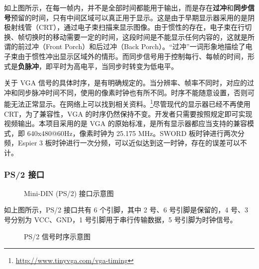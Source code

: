\documentclass[hyperref,UTF8,12pt,a4paper]{ctexart}
\begin{document}
如上图所示，在每一帧内，并不是全部时间都能用于输出，而是存在\textbf{过冲}和\textbf{同步信号}预留的时间，只有中间区域可以真正用于显示。这是由于早期显示器采用的是阴极射线管（CRT），通过电子束扫描来显示图像。由于惯性的存在，电子束在行切换、帧切换时的移动需要一定的时间，这段时间是不能显示任何内容的，这就是所谓的前过冲（Front
Porch）和后过冲（Back
Porch）。``过冲''一词形象地描绘了电子束由于惯性冲出显示区域外的情形。而同步信号用于控制每行、每帧的时间，形式是\textbf{负脉冲}，即平时为高电平，当同步时转变为低电平。

关于 VGA
信号的具体时序，是有明确规定的。当分辨率、帧率不同时，对应的过冲和同步脉冲时间不同，使用的像素时钟也有所不同。时序不能随意设置，否则可能无法正常显示。在网络上可以找到相关资料。\footnote{\url{http://www.tinyvga.com/vga-timing}}尽管现代的显示器已经不再使用
CRT，为了兼容性，VGA
的时序仍然保持不变。开发者只需要按照规定即可实现视频输出。本项目采用的是
VGA 的原始标准，是所有显示器都应当支持的兼容模式，即
640x480@60Hz，像素时钟为 25.175 MHz。SWORD 板时钟进行两次分频，Espier 3
板时钟进行一次分频，可以近似达到这一时钟，存在的误差可以不计。

\hypertarget{ps2-ux63a5ux53e3}{%
\subsubsection{PS/2 接口}\label{ps2-ux63a5ux53e3}}

\begin{figure}[H]
\centering
{}
\caption{Mini-DIN (PS/2) 接口示意图}
\end{figure}

如上图所示，PS/2 接口共有 6 个引脚，其中 2 号、6 号引脚是保留的，4 号、3
号分别为 VCC、GND，1 号引脚用于串行传输数据，5 号引脚为时钟信号。

\begin{figure}[H]
\centering
{}
\caption{PS/2 信号时序示意图}
\end{figure}
\end{document}
